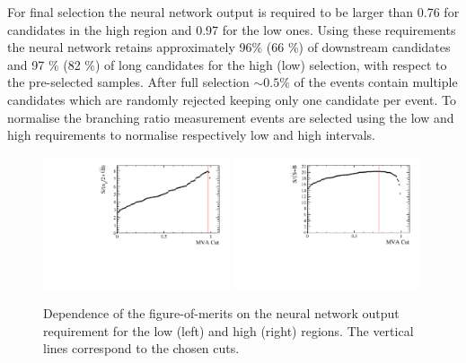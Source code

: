 For final selection the neural network output is required to be larger than 0.76 for candidates in the high \qsq region
and 0.97 for the low \qsq ones. Using these requirements the neural network retains approximately 96\% (66 \%)
of downstream candidates and 97 \% (82 \%) of long candidates for the high (low) \qsq selection, with respect to
the pre-selected samples. After full selection $\sim 0.5$\% of the events contain multiple candidates
which are randomly rejected keeping only one candidate per event. 
%
%
To normalise the branching ratio measurement \jpsi events are selected using the low and high \qsq requirements
 to normalise respectively low and high \qsq intervals. 
%
\begin{figure}
\centering
\includegraphics[width=0.49\textwidth]{Lmumu/figs/Lmumu_lowQ2_FoM.pdf}
\includegraphics[width=0.49\textwidth]{Lmumu/figs/Lmumu_highQ2_FoM.pdf}
\caption{Dependence of the figure-of-merits on the neural network output requirement for the low \qsq
(left) and high \qsq (right) regions. The vertical lines correspond to the chosen cuts.}
\label{fig:Lb_FOM}
\end{figure}
%
